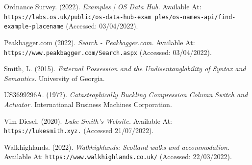 \documentclass[11pt, english]{article}
\begin{document}
\begin{thebibliography}{9}
	\bibitem{}
		Ordnance Survey. (2022).
		\textsl{Examples | OS Data Hub.}
		Available At:
		\texttt{https://labs.os.uk/public/os-data-hub-exam ples/os-names-api/find-example-placename}
		(Accessed: 03/04/2022).

	\bibitem{}
		Peakbagger.com (2022).
		\textsl{Search - Peakbagger.com.}
		Available At:
		\texttt{https://www.peakbagger.com/Search.aspx}
		(Accessed: 03/04/2022).

	\bibitem{}
		Smith, L. (2015).
		\textsl{External Possession and the Undisentanglability of Syntax and Semantics.}
		University of Georgia.

	\bibitem{}
		US3699296A. (1972).
		\textsl{Catastrophically Buckling Compression Column Switch and Actuator.}
		International Business Machines Corporation.

	\bibitem{}
		Vim Diesel. (2020).
		\textsl{Luke Smith's Website.}
		Available At:
		\texttt{https://lukesmith.xyz.}
		(Accessed 21/07/2022).

	\bibitem{}
		Walkhighlands. (2022).
		\textsl{Walkhighlands: Scotland walks and accommodation.}
		Available At:
		\texttt{https://www.walkhighlands.co.uk/}
		(Accessed: 22/03/2022).

	\end{thebibliography}
\end{document}
